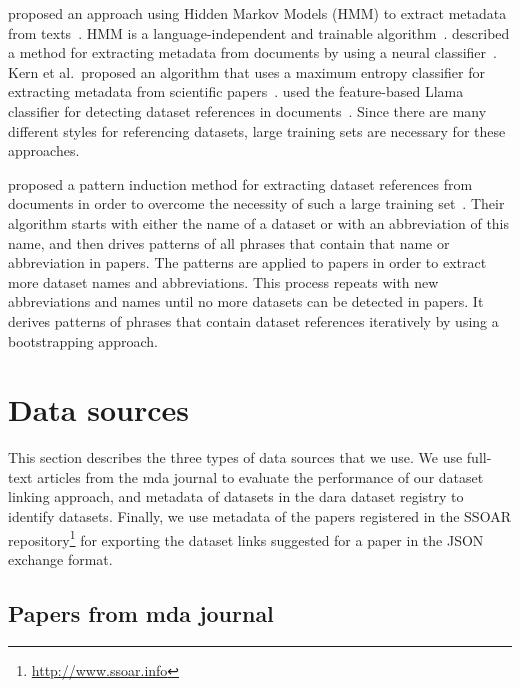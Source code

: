 \documentclass{IOS-Book-Article}
\newcommand{\dara}{\textsf{da\textbar ra}}
\begin{document}
\citeauthor{Cui2010} proposed an approach using Hidden Markov Models (HMM) to extract metadata from texts~\citeyearpar{Cui2010}. 
HMM is a language-independent and trainable algorithm~\cite{Kubala1998}.
\citeauthor{Marinai2009} described a method for extracting metadata from documents by using a neural classifier~\citeyearpar{Marinai2009}.
Kern et al.\ proposed an algorithm that uses a maximum entropy classifier for extracting metadata from scientific papers~\cite{Kern2012}.
\citeauthor{MeiyuLu2012} used the feature-based Llama classifier for detecting dataset references in documents~\citeyearpar{MeiyuLu2012}.
Since there are many different styles for referencing datasets, large training sets are necessary for these approaches.

\citeauthor{Boland2012} proposed a pattern induction method for extracting dataset references from documents in order to overcome the necessity of such a large training set~\citeyearpar{Boland2012}.
Their algorithm starts with either the name of a dataset or with an abbreviation of this name, and then drives patterns of all phrases that contain that name or abbreviation in papers.
The patterns are applied to papers in order to extract more dataset names and abbreviations.
This process repeats with new abbreviations and names until no more datasets can be detected in papers.
It derives patterns of phrases that contain dataset references iteratively by using a bootstrapping approach.

\section{Data sources}
\label{sec:data}
This section describes the three types of data sources that we use. We use full-text articles from the mda journal to evaluate the performance of our dataset linking approach, and metadata of datasets in the {\dara} dataset registry to identify datasets. 
Finally, we use metadata of the papers registered in the SSOAR repository\footnote{\url{http://www.ssoar.info}} for exporting the dataset links suggested for a paper in the JSON exchange format.
 
 \subsection{Papers from mda journal}\label{sec:mda}
 
\end{document}

